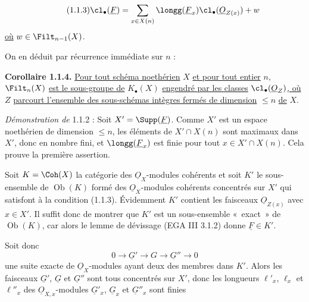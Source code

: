 
\begin{equation}\tag{1.1.3}
\cl_\bullet(\underline{F})=\sum_{x\in X(n)}\longg(\underline{F}_x)\cl_\bullet(\underline{O}_{Z(x)})+w
\end{equation}
\uline{où} $w\in\Filt_{n-1}(X)$.

On en déduit par récurrence immédiate sur $n$ :

\textbf{Corollaire 1.1.4.} \uline{Pour tout schéma noethérien} $X$ \uline{et pour tout entier} $n$, $\Filt_n(X)$ \uline{est le sous-groupe de} $K_\bullet(X)$ \uline{engendré par les classes} $\cl_\bullet(\underline{O}_Z)$\uline{, où} $Z$ \uline{parcourt l'ensemble des sous-schémas intègres fermés de dimension} $\leq n$ \uline{de} $X$.

\emph{Démonstration de} 1.1.2 : Soit $X'=\Supp(\underline{F})$. Comme $X'$ est un espace noethérien de dimension $\leq n$, les éléments de $X'\cap X(n)$ sont maximaux dans $X'$, donc en nombre fini, et $\longg(\underline{F}_x)$ est finie pour tout $x\in X'\cap X(n)$. Cela prouve la première assertion.

Soit ${K}=\Coh(X)$ la catégorie des $\underline{O}_X$-modules cohérents et soit ${K}'$ le sous-ensemble de $\operatorname{Ob}({K})$ formé des $\underline{O}_X$-modules cohérents concentrés sur $X'$ qui satisfont à la condition (1.1.3). Évidemment ${K}'$ contient les faisceaux $\underline{O}_{Z(x)}$ avec $x\in X'$. Il suffit donc de montrer que ${K}'$ est un sous-ensemble «~exact~» de $\operatorname{Ob}({K})$, car alors le lemme de dévissage (EGA III 3.1.2) donne $\underline{F}\in{K}'$.

Soit donc
\begin{equation}\tag{1.1.5}
0\longrightarrow \underline{G}'\longrightarrow G\longrightarrow \underline{G}''\longrightarrow0
\end{equation}
une suite exacte de $\underline{O}_X$-modules ayant deux des membres dans ${K}'$. Alors les faisceaux $\underline{G}'$, $\underline{G}$ et $\underline{G}''$ sont tous concentrés sur $X'$, donc les longueurs $\ell'_x$, $\ell_x$ et $\ell''_x$ des $\underline{O}_{X,x}$-modules $\underline{G}'_x$, $\underline{G}_x$ et $\underline{G}''_x$ sont finies
